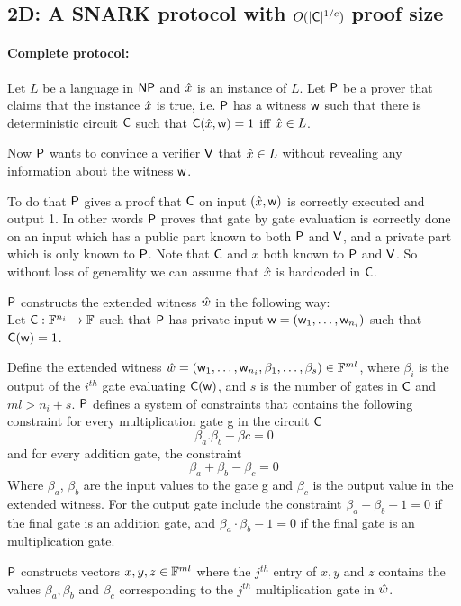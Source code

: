 \subsection{\name2D{}: A SNARK protocol with $O(|\mathsf{C}|^{1/c})$ proof size}
\paragraph{\textbf{Complete protocol:}} Let $L$ be a language in $\mathsf{NP}$ and $\hat{x}$ is an instance of $L$. Let $\mathsf{P}$ be a prover that claims that the instance $\hat{x}$ is true, i.e. $\mathsf{P}$ has a witness $\mathsf{w}$ such that there is deterministic circuit $\mathsf{C}$ such that $\mathsf{C}(\hat{x},\mathsf{w})=1$ iff $\hat{x} \in L$. 

Now $\mathsf{P}$ wants to convince a verifier $\mathsf{V}$ that $\hat{x}\in L$ without revealing any information about the witness $\mathsf{w}$. 

To do that $\mathsf{P}$ gives a proof that $\mathsf{C}$ on input $(\hat{x}, \mathsf{w})$ is correctly executed and output 1. In other words $\mathsf{P}$ proves that gate by gate evaluation is correctly done on an input which has a public part known to both $\mathsf{P}$ and $\mathsf{V}$, and a private part which is only known to $\mathsf{P}$. 
Note that $\mathsf{C}$ and $x$ both known to $\mathsf{P}$ and $\mathsf{V}$. So without loss of generality we can assume that $\hat{x}$ is hardcoded in $\mathsf{C}$.

$\mathsf{P}$ constructs the extended witness $\hat{w}$ in the following way: \\
Let $\mathsf{C}:\mathbb{F}^{n_i}\rightarrow \mathbb{F}$ such that $\mathsf{P}$ has private input $\mathsf{w} = (\mathsf{w}_1,\ldots, \mathsf{w}_{n_i})$ such that $\mathsf{C}(\mathsf{w})=1$.

Define the extended witness $\hat{w} = (\mathsf{w}_1,\ldots,\mathsf{w}_{n_i}, \beta_1,\ldots, \beta_s) \in \mathbb{F}^{ml}$, where $\beta_i$ is the output of the $i^{th}$ gate evaluating $\mathsf{C}(\mathsf{w})$, and $s$ is the number of gates in $\mathsf{C}$ and $ml>n_i + s$. $\mathsf{P}$ defines a system of constraints that contains the following constraint for every multiplication gate g in the circuit $\mathsf{C}$ $$\beta_{a}.\beta_{b}-\beta{c}=0$$
and for every addition gate, the constraint 
$$\beta_a + \beta_b - \beta_c = 0$$
Where $\beta_a$, $\beta_b$ are the input values to the gate g and $\beta_c$ is the output value in the extended witness. For the output gate include the constraint $\beta_a + \beta_b - 1 = 0$ if the final gate is an addition gate, and $\beta_a\cdot \beta_b - 1 = 0$ if the final gate is an multiplication gate. 

$\mathsf{P}$ constructs vectors $x,y,z \in \mathbb{F}^{ml}$ where the $j^{th}$ entry of $x,y$ and $z$ contains the values $\beta_a, \beta_b$ and $\beta_c$ corresponding to the $j^{th}$ multiplication gate in $\hat{w}$.

